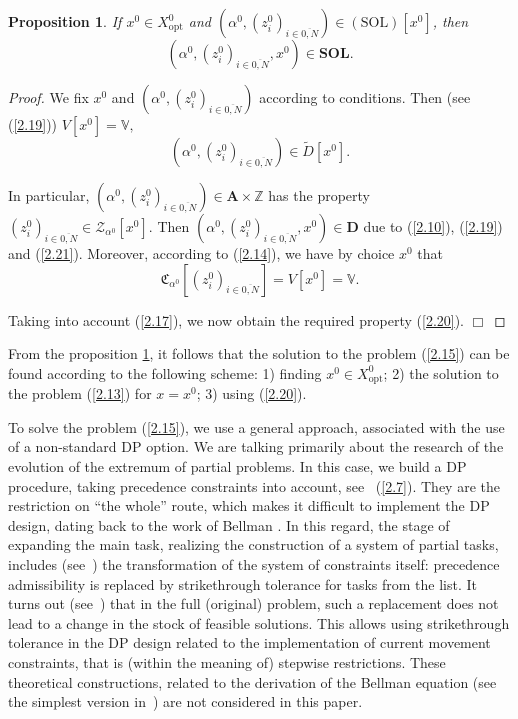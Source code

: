 \documentclass[numbers,sort&compress]{IntechOpen-Book}%
\newtheorem{proposition}{Proposition}
\begin{document}
\begin{proposition}
\label{prop:2.1}
If
$x^0 \in X^0_{\mathrm{opt}}$ and $(\alpha^0,(z_i^0)_{i \in \overline{0,N}}) \in (\mathrm{SOL})[x^0]$,
then
\begin{equation}\label{2.20}
  (\alpha^0,(z_i^0)_{i \in \overline{0,N}},x^0) \in \mathbf{SOL}.
\end{equation}
\end{proposition}

\begin{proof}

We fix
$x^0$
and
$(\alpha^0,(z_i^0)_{i \in \overline{0,N}})$
according to conditions.
Then
(see (\ref{2.19}))
$V[x^0] = \mathbb{V},$
\begin{equation}\label{2.21}
 (\alpha^0,(z_i^0)_{i \in \overline{0,N}}) \in \tilde{D}[x^0].
\end{equation}

In particular,
$(\alpha^0,(z_i^0)_{i \in \overline{0,N}}) \in \mathbf{A} \times \mathbb{Z}$
has the property
$(z_i^0)_{i \in \overline{0,N}} \in \mathcal{Z}_{\alpha^0}[x^0]$.
Then
$(\alpha^0,(z_i^0)_{i \in \overline{0,N}},x^0) \in \mathbf{D}$
due to
 (\ref{2.10}), (\ref{2.19}) and (\ref{2.21}).
Moreover, according to
 (\ref{2.14}),
we have by choice
$x^0$
that
$$
  \mathfrak{C}_{\alpha^0}[(z_i^0)_{i \in \overline{0,N}}] = V[x^0] = \mathbb{V}.
$$

Taking into account
 (\ref{2.17}),
we now obtain the required property
(\ref{2.20}).
\hfill $\Box$
\end{proof}

From the proposition
\ref{prop:2.1},
it follows that
the solution to the problem
 (\ref{2.15})
can be found according to the following scheme:
1) finding $ x ^ 0 \in X ^ 0 _ {\mathrm{opt}}$;
2) the solution to the problem (\ref{2.13}) for $ x = x ^ 0$;
3) using (\ref{2.20}).

To solve the problem
 (\ref{2.15}),
we use a general approach,
associated with the use of a non-standard DP option.
We are talking primarily about the research of
the evolution of the extremum of partial problems.
In this case, we build a DP procedure,
taking precedence constraints into account,
see~ (\ref{2.7}).
They are the restriction on
``the whole''
route,
which makes it difficult to implement the DP design,
dating back to the work of Bellman
\cite{11}.
In this regard,
the stage of expanding the main task,
realizing the construction of a system of partial tasks,
includes
(see~\cite[part 2]{14})
the transformation of the system
of constraints itself:
precedence admissibility
is replaced by strikethrough tolerance
for tasks from the list.
It turns out
(see~\cite[Theorem 2.2.1]{14})
that in the full
(original)
problem,
such a replacement does not lead to
a change in the stock of feasible solutions.
This allows using
strikethrough tolerance
in the DP design
related to the implementation of current movement constraints,
that is
(within the meaning of)
stepwise restrictions.
These theoretical constructions,
related to the derivation of the Bellman equation
(see the simplest version in~\cite[part 3]{14})
are not considered
in this paper.
\end{document}

